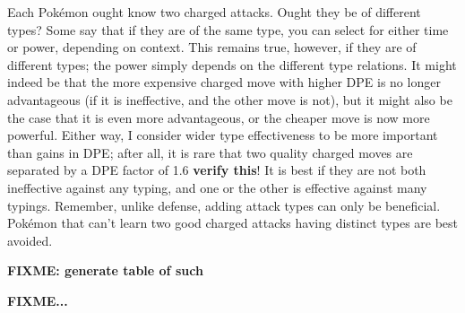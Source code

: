 Each Pokémon ought know two charged attacks.
Ought they be of different types?
Some say that if they are of the same type, you can select for either time or power, depending on context.
This remains true, however, if they are of different types; the power simply depends on
  the different type relations.
It might indeed be that the more expensive charged move with higher DPE is no
  longer advantageous (if it is ineffective, and the other move is not),
  but it might also be the case that it is even more advantageous,
  or the cheaper move is now more powerful.
Either way, I consider wider type effectiveness to be more important than gains in DPE;
  after all, it is rare that two quality charged moves are separated by a DPE factor
  of 1.6 \textbf{verify this}!
It is best if they are not both ineffective against any typing, and one or the
  other is effective against many typings.
Remember, unlike defense, adding attack types can only be beneficial.
Pokémon that can't learn two good charged attacks having distinct types are best avoided.

  \textbf{FIXME: generate table of such}

\textbf{FIXME...}
